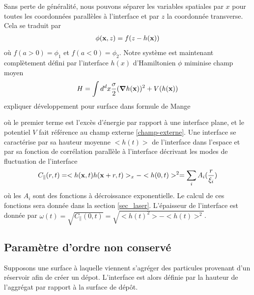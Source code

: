 Sans perte de généralité, nous pouvons séparer les variables spatiales par $x$ pour toutes les coordonnées parallèles à l'interface et par $z$ la coordonnée transverse. Cela se traduit par
\begin{align}
    \phi({\bf x},z) = f(z-h({\bf x}))
    \label{capillary-wave-theory}
\end{align}
où $f(a \greater 0) = \phi_1$ et $f(a \less 0) = \phi_2$. Notre système est maintenant complètement défini par l'interface $h(x)$ d'Hamiltonien
{\color{red} $\phi$ miminise champ moyen }
\begin{align}
    H = \int d^d x \frac{\sigma}{2} ({\boldsymbol \nabla} h({\bf x}))^2 + V(h({\bf x}))
    \label{hamil-cwt}
\end{align}
{\color{red} expliquer développement pour surface dans formule de Mange}

où le premier terme est l'excès d'énergie par rapport à une interface plane, et le potentiel $V$ fait référence au champ externe \ref{champ-externe}. 
Une interface se caractérise par sa hauteur moyenne $<h(t)>$ de l'interface dans l'espace et par sa fonction de corrélation parallèle à l'interface décrivant les modes de fluctuation de l'interface
\begin{align}
    C_\parallel(r,t) = <h({\bf x},t)h({\bf x}+r,t)>_x - <h(0,t)>^2 = \sum_i A_i(\frac{r}{\xi_i}) 
\end{align}
où les $A_i$ sont des fonctions à décroissance exponentielle. Le calcul de ces fonctions sera donnée dans la section \ref{sec_laser}. 
L'épaisseur de l'interface est donnée par $\omega(t) = \sqrt{C_\parallel(0,t)} = \sqrt{<h(t)^2> - <h(t)>^2}$. 

    \subsection{Paramètre d'ordre non conservé}

Supposons une surface à laquelle viennent s'agréger des particules provenant d'un réservoir afin de créer un dépot. L'interface est alors définie par la hauteur de l'aggrégat par rapport à la surface de dépôt.

